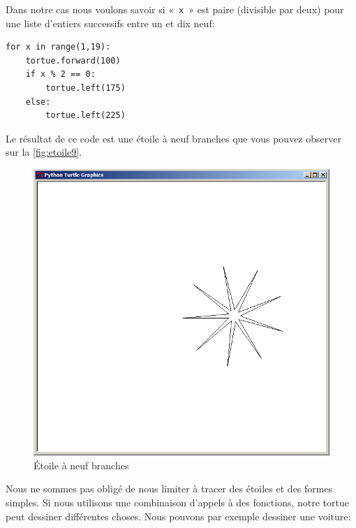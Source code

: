 Dans notre cas nous voulons savoir si «~\texttt{x}~»  est paire (divisible par deux) pour une liste d'entiers successifs entre un et dix neuf:

\begin{Verbatim}[frame=single,rulecolor=\color{mbleu}, label=à taper]
for x in range(1,19):
    tortue.forward(100)
    if x % 2 == 0:
        tortue.left(175)
    else:
        tortue.left(225)
\end{Verbatim}

Le résultat de ce code est une étoile à neuf branches que vous pouvez observer sur la \autoref{fig:etoile9}.

\begin{figure}[H]
\centering
\includegraphics[scale=0.4]{images/etoile9}
\caption{Étoile à neuf branches}\label{fig:etoile9}
\end{figure}

Nous ne sommes pas obligé de nous limiter à tracer des étoiles et des formes simples. Si nous utilisons une combinaison d'appels à des fonctions, notre tortue peut dessiner différentes choses. Nous pouvons par exemple dessiner une voiture:

